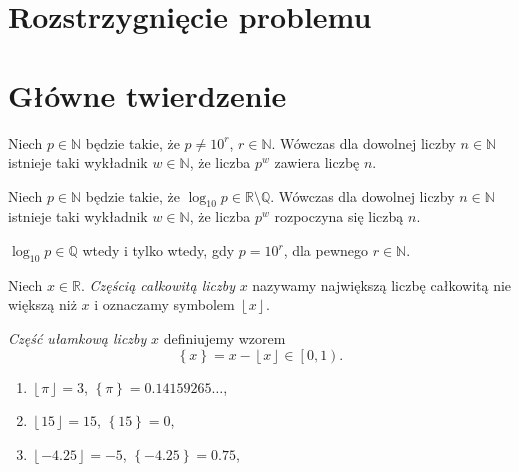 \documentclass{beamer}
\newcommand{\enumsymbol}{$\triangleright$}
\newcommand{\R}{\mathbb{R}}
\newcommand{\Q}{\mathbb{Q}}
\newcommand{\N}{\mathbb{N}}
\newcommand{\define}[1]{\textit{#1}}
\newcommand{\floor}[1]{\left\lfloor #1 \right\rfloor}
\newcommand{\fracpart}[1]{\left\{ #1 \right\}}
\begin{document}
\section{Rozstrzygnięcie problemu}
\section{Główne twierdzenie}

\begin{frame}
  \begin{theorem}
    Niech $p \in \N$ będzie takie, że $p \not = 10^r$, $r \in \N$.
    Wówczas dla dowolnej liczby $n \in \N$ istnieje taki wykładnik $w \in \N$, że liczba $p^w$ zawiera liczbę $n$.
  \end{theorem}
  \begin{lemma}
    \label{lemma::powers_beginb_with_every_string}
    Niech $p \in \N$ będzie takie, że $\log_{10}p \in \R \setminus \Q$.
    Wówczas dla dowolnej liczby $n \in \N$ istnieje taki wykładnik $w \in \N$, że liczba $p^w$ rozpoczyna się liczbą $n$. 
  \end{lemma}
  \begin{lemma}
    \label{lemma::log_10_irrational_iff}
    $\log_{10}p \in \Q$ wtedy i tylko wtedy, gdy $p = 10^r$, dla pewnego $r \in \N$.
  \end{lemma}
\end{frame}

\begin{frame}
\begin{definition}
Niech $x \in \R$.
\define{Częścią całkowitą liczby} $x$ nazywamy największą liczbę całkowitą nie większą niż $x$ i oznaczamy symbolem $\floor{x}$.

\define{Część ułamkową liczby} $x$ definiujemy wzorem
\begin{equation*}
\fracpart{x} = x-\floor{x} \in \left[0, 1\right).
\end{equation*}
\end{definition}
\begin{example}
  \begin{enumerate}[label=\enumsymbol]
    \item $\floor{\pi} = 3$, $\fracpart{\pi} = 0.14159265\ldots{}$,
    \item $\floor{15} = 15$, $\fracpart{15} = 0$,
    \item $\floor{-4.25} = -5$, $\fracpart{-4.25} = 0.75$, 
  \end{enumerate}
\end{example}
\end{frame}
\end{document}
